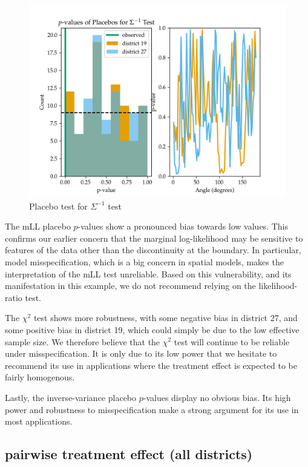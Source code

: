 \documentclass[letter]{article}
\makeatletter
\def\maxwidth{\ifdim\Gin@nat@width>\linewidth\linewidth
\else\Gin@nat@width\fi}
\let\Oldincludegraphics\includegraphics
\renewcommand{\includegraphics}[1]{\Oldincludegraphics[width=.8\maxwidth]{#1}}
\makeatother
\begin{document}
\begin{figure}
\centering
\includegraphics{NYC/NYC_plots/placebo_invvar.png}
\caption{Placebo test for \(\Sigma^{-1}\) test}
\end{figure}

The mLL placebo \(p\)-values show a pronounced bias towards low values.
This confirms our earlier concern that the marginal log-likelihood may be sensitive to features of the data other than the discontinuity at the boundary.
In particular, model misspecification, which is a big concern in spatial models, makes the interpretation of the mLL test unreliable.
Based on this vulnerability, and its manifestation in this example, we do not recommend relying on the likelihood-ratio test.

The \(\chi^2\) test shows more robustness, with some negative bias in district 27, and some positive bias in district 19, which could simply be due to the low effective sample size.
We therefore believe that the \(\chi^2\) test will continue to be reliable under misspecification.
It is only due to its low power that we hesitate to recommend its use in applications where the treatment effect is expected to be fairly homogenous.

Lastly, the inverse-variance placebo \(p\)-values display no obvious bias.
Its high power and robustness to misspecification make a strong argument
for its use in most applications.
    


    	\subsection{pairwise treatment effect (all districts)}\label{pairwise-treatment-effect-all-districts}
\end{document}
